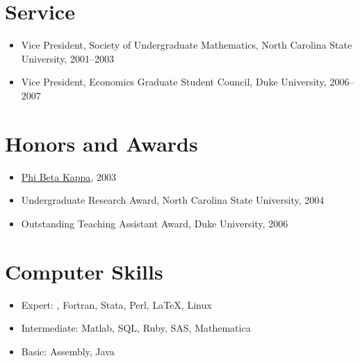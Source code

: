 \documentclass[overlapped,line,letterpaper]{res}
\begin{document}
\begin{resume}

%


\section{\bf Service}

\begin{itemize}
\item Vice President, Society of Undergraduate Mathematics, North
  Carolina State University, 2001--2003
\item Vice President, Economics Graduate Student Council, Duke
  University, 2006--2007
\end{itemize}


\section{\bf Honors and Awards}
\begin{itemize}
\item \href{http://www.pbk.org/}{Phi Beta Kappa}, 2003
\item Undergraduate Research Award, North Carolina State University, 2004
\item Outstanding Teaching Assistant Award, Duke University, 2006
\end{itemize}

\section{\bf Computer Skills}

\begin{itemize}
\item Expert: \Cplusplus, Fortran, Stata, Perl, \LaTeX, Linux
\item Intermediate: Matlab, SQL, Ruby, SAS, Mathematica
\item Basic: Assembly, Java
\end{itemize}


\end{resume}
\end{document}
